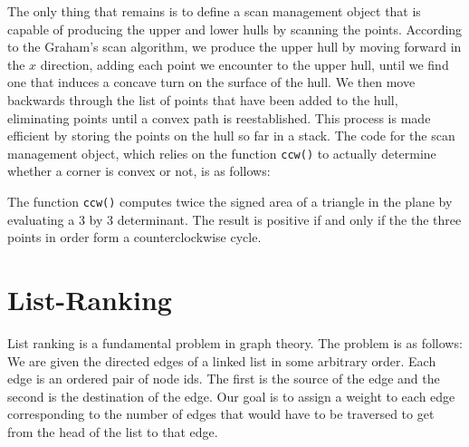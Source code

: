 

The only thing that remains is to define a scan management object that
is capable of producing the upper and lower hulls by scanning the
points.  According to the Graham's scan algorithm, we produce the
upper hull by moving forward in the $x$ direction, adding each
point we encounter to the upper hull, until we find one that induces a
concave turn on the surface of the hull.  We then move backwards
through the list of points that have been added to the hull,
eliminating points until a convex path is reestablished.  This process
is made efficient by storing the points on the hull so far in a stack.
The code for the scan management object, which relies on the function
\lstinline|ccw()| to actually determine whether a corner is
convex or not, is as follows:



The function \lstinline|ccw()| computes twice the signed area of a triangle in
the plane by evaluating a 3 by 3 determinant.  The result is positive
if and only if the the three points in order form a counterclockwise
cycle.




\section{List-Ranking}
\label{sec:list-ranking}

List ranking is a fundamental problem in graph theory.  The problem is
as follows: We are given the directed edges of a linked list in some
arbitrary order.  Each edge is an ordered pair of node ids.  The first
is the source of the edge and the second is the destination of the
edge.  Our goal is to assign a weight to each edge corresponding to
the number of edges that would have to be traversed to get from the
head of the list to that edge.

